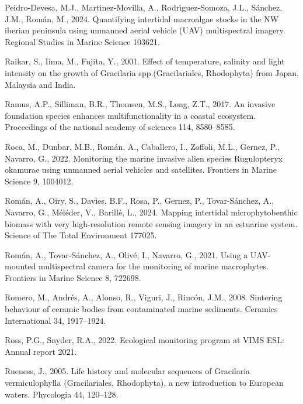 \documentclass[
  letterpaper,
  DIV=11,
  numbers=noendperiod]{scrartcl}
\newlength{\cslhangindent}
\newenvironment{CSLReferences}[2] %
 {\begin{list}{}{%
  \setlength{\itemindent}{0pt}
  \setlength{\leftmargin}{0pt}
  \setlength{\parsep}{0pt}
  \ifodd #1
   \setlength{\leftmargin}{\cslhangindent}
   \setlength{\itemindent}{-1\cslhangindent}
  \fi
  \setlength{\itemsep}{#2\baselineskip}}}
 {\end{list}}
\begin{document}
\begin{CSLReferences}{1}{0}
Peidro-Devesa, M.J., Martı́nez-Movilla, A., Rodrı́guez-Somoza, J.L.,
Sánchez, J.M., Román, M., 2024. Quantifying intertidal macroalgae stocks
in the NW iberian peninsula using unmanned aerial vehicle (UAV)
multispectral imagery. Regional Studies in Marine Science 103621.

Raikar, S., Iima, M., Fujita, Y., 2001. Effect of temperature, salinity
and light intensity on the growth of {G}racilaria spp.({G}racilariales,
{R}hodophyta) from {J}apan, {M}alaysia and {I}ndia.

Ramus, A.P., Silliman, B.R., Thomsen, M.S., Long, Z.T., 2017. An
invasive foundation species enhances multifunctionality in a coastal
ecosystem. Proceedings of the national academy of sciences 114,
8580--8585.

Roca, M., Dunbar, M.B., Román, A., Caballero, I., Zoffoli, M.L., Gernez,
P., Navarro, G., 2022. Monitoring the marine invasive alien species
{R}ugulopteryx okamurae using unmanned aerial vehicles and satellites.
Frontiers in Marine Science 9, 1004012.

Román, A., Oiry, S., Davies, B.F., Rosa, P., Gernez, P., Tovar-Sánchez,
A., Navarro, G., Méléder, V., Barillé, L., 2024. Mapping intertidal
microphytobenthic biomass with very high-resolution remote sensing
imagery in an estuarine system. Science of The Total Environment 177025.

Román, A., Tovar-Sánchez, A., Olivé, I., Navarro, G., 2021. Using a
UAV-mounted multispectral camera for the monitoring of marine
macrophytes. Frontiers in Marine Science 8, 722698.

Romero, M., Andrés, A., Alonso, R., Viguri, J., Rincón, J.M., 2008.
Sintering behaviour of ceramic bodies from contaminated marine
sediments. Ceramics International 34, 1917--1924.

Ross, P.G., Snyder, R.A., 2022. Ecological monitoring program at VIMS
ESL: Annual report 2021.

Rueness, J., 2005. Life history and molecular sequences of {G}racilaria
vermiculophylla ({G}racilariales, {R}hodophyta), a new introduction to
{E}uropean waters. Phycologia 44, 120--128.


\end{CSLReferences}
\end{document}

